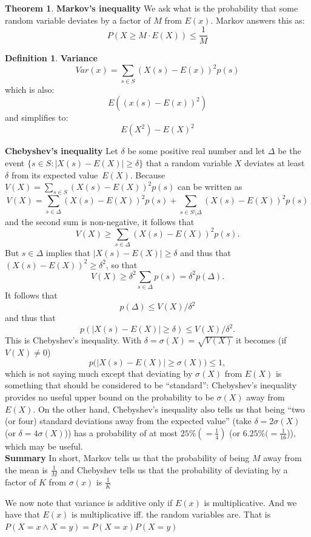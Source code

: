\documentclass[titlepage]{article}
\theoremstyle{definition}
\newtheorem{theorem}{Theorem}[section]
\newtheorem{definition}{Definition}
\numberwithin{equation}{subsection}
\numberwithin{remark}{subsection}
\begin{document}
\begin{theorem}\textbf{Markov's inequality}
We ask what is the probability that some random variable deviates by a factor of $M$ from $E(x)$. Markov answers this as:
$$P(X \geq M \cdot E(X)) \leq \frac{1}{M}$$
\end{theorem}

\begin{definition}\textbf{Variance}
$$Var(x) = \sum_{s\in S} (X(s) - E(x))^{2}p(s)$$
which is also:
$$E((x(s) - E(x))^{2})$$
and simplifies to:
$$E(X^{2}) - E(X)^{2}$$
\end{definition}

{\bf Chebyshev's inequality} Let $\delta$ be some positive real number and let $\Delta$ be the event $\{s\in S: |X(s)-E(X)|\ge\delta\}$ that a random variable $X$ deviates at least~$\delta$ from its expected value~$E(X)$.
Because $V(X)=\sum_{s\in S}(X(s)-E(X))^2p(s)$ can be written as
$$V(X)=\sum_{s\in \Delta}(X(s)-E(X))^2p(s) + \sum_{s\in S\setminus\Delta}(X(s)-E(X))^2p(s)$$
and the second sum is non-negative, it follows that
$$V(X)\ge\sum_{s\in \Delta}(X(s)-E(X))^2p(s).$$
But $s\in \Delta$ implies that $|X(s)-E(X)|\ge\delta$ and thus that $(X(s)-E(X))^2\ge\delta^2$, so that
$$V(X)\ge\delta^2\sum_{s\in \Delta}p(s)=\delta^2p(\Delta).$$
It follows that
$$p(\Delta)\le V(X)/\delta^2$$
and thus that
$$p(|X(s)-E(X)|\ge\delta)\le V(X)/\delta^2.$$
This is Chebyshev's inequality.
With $\delta =\sigma(X)= \sqrt{V(X)}$ it becomes (if $V(X)\ne 0$)$$p\big(|X(s)-E(X)|\ge\sigma(X)\big)\le 1,$$which is not saying much except that deviating by $\sigma(X)$ from $E(X)$ is something that should be considered to be ``standard'':
Chebyshev's inequality provides no useful upper bound on the probability to be $\sigma(X)$ away from $E(X)$.
On the other hand, Chebyshev's inequality also tells us that being ``two (or four) standard deviations away from the expected value'' (take $\delta=2\sigma(X)$ (or $\delta=4\sigma(X)$)) has a probability of at most $25\%(=\frac14)$ (or $6.25\%(=\frac1{16}$)), which may be useful.
\\

\textbf{Summary} In short, Markov tells us that the probability of being $M$ away from the mean is $\frac{1}{M}$ and Chebyshev tells us that the probability of deviating by a factor of $K$ from $\sigma(x)$ is $\frac{1}{K}$ 

We now note that variance is additive only if $E(x)$ is multiplicative. And we have that $E(x)$ is multiplicative iff. the random variables are. That is $P( X = x \land X = y) = P(X=x)P(X = y)$
\end{document}
